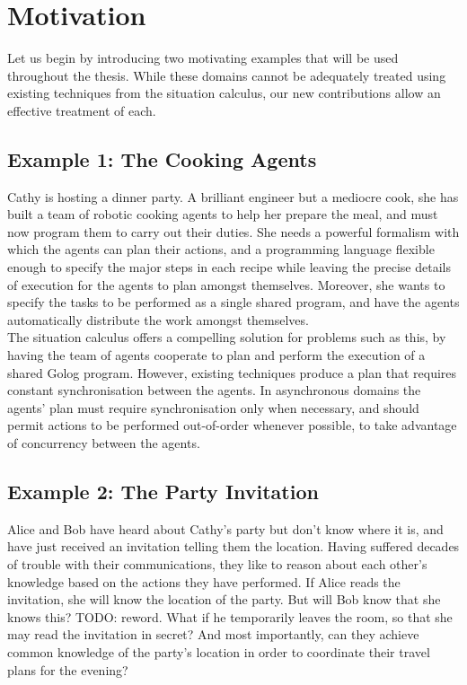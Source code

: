 \section{Motivation}

Let us begin by introducing two motivating examples that will be used
throughout the thesis. While these domains cannot be adequately treated
using existing techniques from the situation calculus, our new contributions
allow an effective treatment of each.


\subsection*{Example 1: The Cooking Agents}

Cathy is hosting a dinner party. A brilliant engineer but a mediocre
cook, she has built a team of robotic cooking agents to help her prepare
the meal, and must now program them to carry out their duties. She
needs a powerful formalism with which the agents can plan their actions,
and a programming language flexible enough to specify the major steps
in each recipe while leaving the precise details of execution for
the agents to plan amongst themselves. Moreover, she wants to specify
the tasks to be performed as a single shared program, and have the
agents automatically distribute the work amongst themselves.\\


The situation calculus offers a compelling solution for problems such
as this, by having the team of agents cooperate to plan and perform
the execution of a shared Golog program. However, existing techniques
produce a plan that requires constant synchronisation between the
agents. In asynchronous domains the agents' plan must require synchronisation
only when necessary, and should permit actions to be performed out-of-order
whenever possible, to take advantage of concurrency between the agents.


\subsection*{Example 2: The Party Invitation}

Alice and Bob have heard about Cathy's party but don't know where
it is, and have just received an invitation telling them the location.
Having suffered decades of trouble with their communications, they
like to reason about each other's knowledge based on the actions they
have performed. If Alice reads the invitation, she will know the location
of the party. But will Bob know that she knows this? TODO: reword. 
What if he temporarily
leaves the room, so that she may read the invitation in secret? And
most importantly, can they achieve common knowledge of the party's
location in order to coordinate their travel plans for the evening?\\


